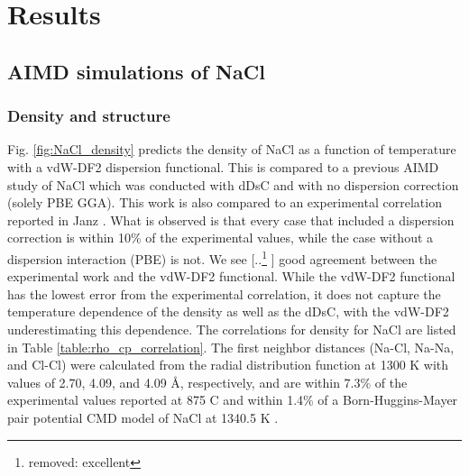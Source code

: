 \documentclass[review]{elsarticle}
\providecommand{\DIFaddtex}[1]{{\protect\color{blue} \sf #1}} %
\providecommand{\DIFdeltex}[1]{{\protect\color{red} [..\footnote{removed: #1} ]}} %
\providecommand{\DIFaddbegin}{} %
\providecommand{\DIFaddend}{} %
\providecommand{\DIFdelbegin}{} %
\providecommand{\DIFdelend}{} %
\providecommand{\DIFadd}[1]{\texorpdfstring{\DIFaddtex{#1}}{#1}} %
\providecommand{\DIFdel}[1]{\texorpdfstring{\DIFdeltex{#1}}{}} %
\newcommand{\DIFscaledelfig}{0.5}
\newlength{\DIFdelgraphicswidth} %
\newlength{\DIFdelgraphicsheight} %
\newcommand{\DIFaddincludegraphics}[2][]{{\color{blue}\fbox{\DIFOincludegraphics[#1]{#2}}}} %
\newcommand{\DIFdelincludegraphics}[2][]{%
\sbox{\DIFdelgraphicsbox}{\DIFOincludegraphics[#1]{#2}}%
\settoboxwidth{\DIFdelgraphicswidth}{\DIFdelgraphicsbox} %
\settoboxtotalheight{\DIFdelgraphicsheight}{\DIFdelgraphicsbox} %
\scalebox{\DIFscaledelfig}{%
\parbox[b]{\DIFdelgraphicswidth}{\usebox{\DIFdelgraphicsbox}\\[-\baselineskip] \rule{\DIFdelgraphicswidth}{0em}}\llap{\resizebox{\DIFdelgraphicswidth}{\DIFdelgraphicsheight}{%
\setlength{\unitlength}{\DIFdelgraphicswidth}%
\begin{picture}(1,1)%
\thicklines\linethickness{2pt} %
{\color[rgb]{1,0,0}\put(0,0){\framebox(1,1){}}}%
{\color[rgb]{1,0,0}\put(0,0){\line( 1,1){1}}}%
{\color[rgb]{1,0,0}\put(0,1){\line(1,-1){1}}}%
\end{picture}%
}\hspace*{3pt}}} %
} %
\DeclareRobustCommand{\DIFaddbegin}{\DIFOaddbegin \let\includegraphics\DIFaddincludegraphics} %
\DeclareRobustCommand{\DIFaddend}{\DIFOaddend \let\includegraphics\DIFOincludegraphics} %
\DeclareRobustCommand{\DIFdelbegin}{\DIFOdelbegin \let\includegraphics\DIFdelincludegraphics} %
\DeclareRobustCommand{\DIFdelend}{\DIFOaddend \let\includegraphics\DIFOincludegraphics} %
\begin{document}
\section{Results}

\subsection{AIMD simulations of NaCl}
\subsubsection{Density and structure}

Fig. \ref{fig:NaCl_density} predicts the density of NaCl as a function of temperature with a vdW-DF2 dispersion functional. This is compared to a previous AIMD study of NaCl \cite{ANDERSSON2022153836} which was conducted with dDsC and with no dispersion correction (solely PBE GGA). This work is also compared to an experimental correlation reported in Janz \cite{janz1988thermodynamic}. What is observed is that every case that included a dispersion correction is within 10\% of the experimental values, while the case without a dispersion interaction (PBE) is not. We see \DIFdelbegin \DIFdel{excellent }\DIFdelend \DIFaddbegin \DIFadd{good }\DIFaddend agreement between the experimental work and the vdW-DF2 functional. While the vdW-DF2 functional has the lowest error from the experimental correlation, it does not capture the temperature dependence of the density as well as the dDsC, with the vdW-DF2 underestimating this dependence. The correlations for density for NaCl are listed in Table \ref{table:rho_cp_correlation}. The first neighbor distances (Na-Cl, Na-Na, and Cl-Cl) were calculated from the radial distribution function at 1300 K with values of 2.70, 4.09, and 4.09 {\AA}, respectively, and are within 7.3\% of the experimental values reported at 875 \degree C \cite{edwards1975structure} and within 1.4\% of a Born-Huggins-Mayer pair potential  CMD model of NaCl at 1340.5 K \cite{lantelme1974application}. 
\end{document}
